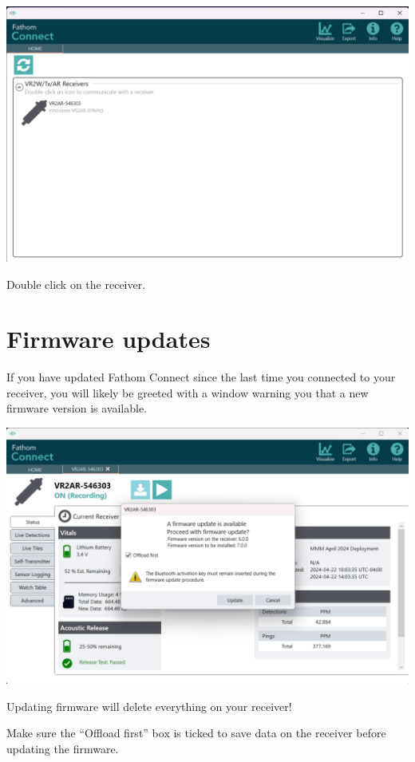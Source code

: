 \documentclass[
  letterpaper,
  DIV=11,
  numbers=noendperiod]{scrreprt}
\begin{document}
\includegraphics{images/fathom/home_with_rec.png}

Double click on the receiver.

\section{Firmware updates}\label{firmware-updates}

If you have updated Fathom Connect since the last time you connected to
your receiver, you will likely be greeted with a window warning you that
a new firmware version is available.

\includegraphics{images/fathom/firmware_notice.png}

\begin{tcolorbox}[enhanced jigsaw, title=\textcolor{quarto-callout-important-color}{\faExclamation}\hspace{0.5em}{Important}, leftrule=.75mm, colback=white, colframe=quarto-callout-important-color-frame, opacityback=0, toptitle=1mm, titlerule=0mm, colbacktitle=quarto-callout-important-color!10!white, toprule=.15mm, left=2mm, bottomtitle=1mm, arc=.35mm, breakable, coltitle=black, rightrule=.15mm, bottomrule=.15mm, opacitybacktitle=0.6]

Updating firmware will delete everything on your receiver!

Make sure the ``Offload first'' box is ticked to save data on the
receiver before updating the firmware.

\end{tcolorbox}
\end{document}
